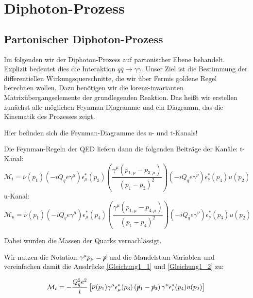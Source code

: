\chapter{Diphoton-Prozess}
\label{2}
\section{Partonischer Diphoton-Prozess}
Im folgenden wir der Diphoton-Prozess auf partonischer Ebene behandelt. Explizit bedeutet dies die Interaktion $q\overline{q} \rightarrow \gamma \gamma$. Unser Ziel ist die Bestimmung der differentiellen Wirkungsquerschnitte, die wir über Fermis goldene Regel berechnen wollen. Dazu benötigen wir die lorenz-invarianten Matrixübergangselemente der grundlegenden Reaktion. Das heißt wir erstellen zunächst alle möglichen Feynman-Diagramme und ein Diagramm, das die Kinematik des Prozesses zeigt. 


Hier befinden sich die Feynman-Diagramme des u- und t-Kanals!

Die Feynman-Regeln der QED liefern dann die folgenden Beiträge der Kanäle:
t-Kanal:
\begin{equation}
 \mathcal{M}_t = \overline{\nu}\left(p_1\right) \left(-iQ_qe\gamma^\mu\right) \epsilon^*_\mu\left(p_3\right) \left(\frac{\gamma^\mu \left(p_{1,\mu} - p_{3, \mu}\right)}{\left(p_1 - p_3\right)^2}\right) \left(-iQ_qe\gamma^\nu\right) \epsilon^*_\nu\left(p_4\right) u\left( p_2\right)
 \label{Gleichung1_1}
\end{equation}
u-Kanal:
\begin{equation}
	 \mathcal{M}_u = \overline{\nu}\left(p_1\right) \left(-iQ_qe\gamma^\mu\right) \epsilon^*_\mu\left(p_4\right) \left(\frac{\gamma^\mu \left(p_{1,\mu} - p_{4, \mu}\right)}{\left(p_1 - p_4\right)^2}\right) \left(-iQ_qe\gamma^\nu\right) \epsilon^*_\nu\left(p_3\right) u\left( p_2\right)
	 \label{Gleichung1_2}
\end{equation}

Dabei wurden die Massen der Quarks vernachlässigt.

Wir nutzen die Notation $\gamma^\mu p_\mu = \cancel{p}$ und die Mandelstam-Variablen  und vereinfachen damit die Ausdrücke \autoref{Gleichung1_1} und \autoref{Gleichung1_2} zu:

\begin{equation}
\mathcal{M}_t = -\frac{Q_q^2e^2}{t}\left[ \overline{\nu}(p_1) \gamma^\mu \epsilon^*_\mu(p_3) \left(\cancel{p}_1 - \cancel{p}_3\right) \gamma^\nu \epsilon^*_\nu(p_4) u(p_2)\right] 
\end{equation}


